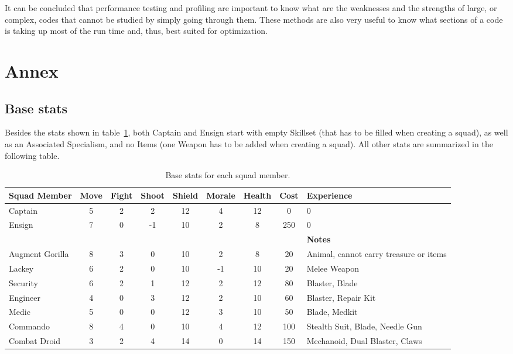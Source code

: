 \documentclass[12pt,a4paper]{article}
\begin{document}
It can be concluded that performance testing and profiling are important to 
know what are the weaknesses and the strengths of large, or complex, codes that 
cannot be studied by simply going through them. These methods are also very 
useful to know what sections of a code is taking up most of the run time and, 
thus, best suited for optimization.

\newpage

\section{Annex}

\subsection{Base stats}

Besides the stats shown in table~\ref{simple_table}, both Captain and Ensign start with empty Skillset (that has to be filled when creating a squad), as well as an Associated Specialism, and no Items (one Weapon has to be added when creating a squad). All other stats are summarized in the following table.

\begin{table}[h]
\begin{center}
\begin{tabular}{| m{1.7cm} |c|c|c|c|c|c|c| m{2.2cm} |}
\hline
{\bf Squad Member} & {\bf Move} & {\bf Fight} & {\bf Shoot} & {\bf Shield} & {\bf Morale} & {\bf Health} & {\bf Cost} & {\bf Experience}\\
\hline
  Captain & 5 & 2 & 2 & 12 & 4 & 12 & 0 & 0\\
  \hline
  Ensign & 7 & 0 & -1 & 10 & 2 & 8 & 250 & 0\\
  \hline
  & & & & & & & & {\bf Notes} \\
  \hline
  Augment Gorilla & 8 & 3 & 0 & 10 & 2 & 8 & 20 & Animal, cannot carry treasure or items\\
  \hline
  Lackey & 6 & 2 & 0 & 10 & -1 & 10 & 20 & Melee Weapon\\
  \hline
  Security & 6 & 2 & 1 & 12 & 2 & 12 & 80 & Blaster, Blade\\
  \hline
  Engineer & 4 & 0 & 3 & 12 & 2 & 10 & 60 & Blaster, Repair Kit\\
  \hline
  Medic & 5 & 0 & 0 & 12 & 3 & 10 & 50 & Blade, Medkit\\
  \hline
  Commando & 8 & 4 & 0 & 10 & 4 & 12 & 100 & Stealth Suit, Blade, Needle Gun\\
  \hline
  Combat Droid & 3 & 2 & 4 & 14 & 0 & 14 & 150 & Mechanoid, Dual Blaster, Claws\\
\hline
\end{tabular}
\end{center}
\caption{Base stats for each squad member.}
\label{simple_table}
\end{table}
\end{document}
